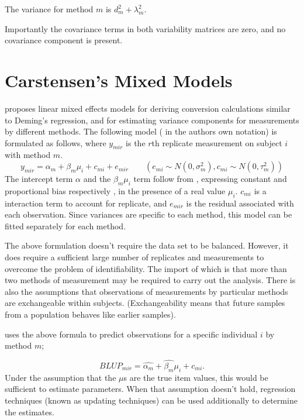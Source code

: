 \documentclass[12pt, a4paper]{report}
\theoremstyle{plain}
\theoremstyle{definition}
\theoremstyle{remark}
\begin{document}
The variance for method $m$ is $d^2_{m}+\lambda^2_{m}$.

Importantly the covariance terms in both variability matrices are zero, and no covariance component is present.



\section{Carstensen's Mixed Models}

\citet{BXC2004} proposes linear mixed effects models for deriving
conversion calculations similar to Deming's regression, and for
estimating variance components for measurements by different
methods. The following model ( in the authors own notation) is
formulated as follows, where $y_{mir}$ is the $r$th replicate
measurement on subject $i$ with method $m$.
\begin{equation}
y_{mir}  = \alpha_{m} + \beta_{m}\mu_{i} + c_{mi} + e_{mir} \qquad
( e_{mi} \sim N(0,\sigma^{2}_{m}), c_{mi} \sim N(0,\tau^{2}_{m}))
\end{equation}
The intercept term $\alpha$ and the $\beta_{m}\mu_{i}$ term follow
from \citet{DunnSEME}, expressing constant and proportional bias
respectively , in the presence of a real value $\mu_{i}.$
$c_{mi}$ is a interaction term to account for replicate, and
$e_{mir}$ is the residual associated with each observation.
Since variances are specific to each method, this model can be
fitted separately for each method.


The above formulation doesn't require the data set to be balanced.
However, it does require a sufficient large number of replicates
and measurements to overcome the problem of identifiability. The
import of which is that more than two methods of measurement may
be required to carry out the analysis. There is also the
assumptions that observations of measurements by particular
methods are exchangeable within subjects. (Exchangeability means
that future samples from a population behaves like earlier
samples).



\citet{BXC2004} uses the above formula to predict observations for
a specific individual $i$ by method $m$;

\begin{equation}BLUP_{mir} = \hat{\alpha_{m}} + \hat{\beta_{m}}\mu_{i} +
c_{mi}. \end{equation} Under the assumption that the $\mu$s are
the true item values, this would be sufficient to estimate
parameters. When that assumption doesn't hold, regression
techniques (known as updating techniques) can be used additionally
to determine the estimates. 
\end{document}
